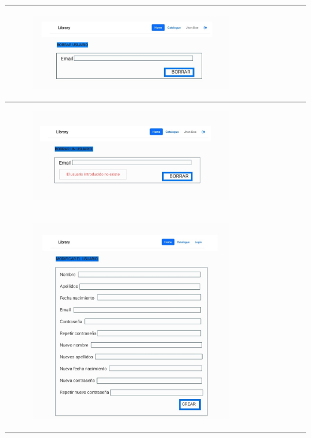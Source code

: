 \documentclass{report}
\begin{document}
\begin{center}
\begin{longtable}{|p{\linewidth}|}
                    \hline
                    \begin{figure}[H]
                        \centering
                        \includegraphics[width=0.8\textwidth]{./img/grafico/BorrarUsu.jpg}
                    \end{figure}\\
                    \hline
                    \begin{figure}[H]
                        \centering
                        \includegraphics[width=0.8\textwidth]{./img/grafico/ErrorBorrarUsu.jpg}
                    \end{figure}\\
                    \hline
                    \begin{figure}[H]
                        \centering
                        \includegraphics[width=0.8\textwidth]{./img/grafico/ModificarUsu.jpg}

\end{figure}
\end{longtable}
\end{center}
\end{document}
